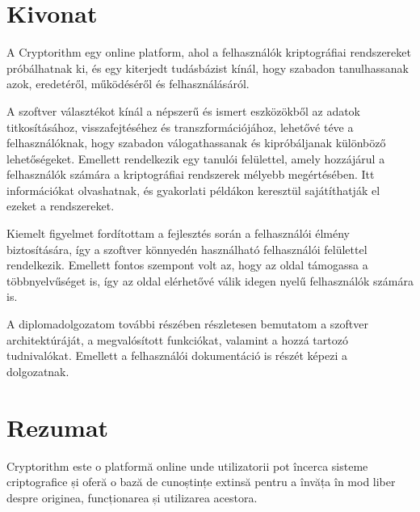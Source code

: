 
\hungarianParagraph


\chapter*{Kivonat}

A Cryptorithm egy online platform, ahol a felhasználók kriptográfiai rendszereket próbálhatnak ki, és egy kiterjedt tudásbázist kínál, hogy szabadon tanulhassanak azok, eredetéről, működéséről és felhasználásáról.

A szoftver választékot kínál a népszerű és ismert eszközökből az adatok titkosításához, visszafejtéséhez és transzformációjához, lehetővé téve a felhasználóknak, hogy szabadon válogathassanak és kipróbáljanak különböző lehetőségeket. Emellett rendelkezik egy tanulói felülettel, amely hozzájárul a felhasználók számára a kriptográfiai rendszerek mélyebb megértésében. Itt információkat olvashatnak, és gyakorlati példákon keresztül sajátíthatják el ezeket a rendszereket. 

Kiemelt figyelmet fordítottam a fejlesztés során a felhasználói élmény biztosítására, így a szoftver könnyedén használható felhasználói felülettel rendelkezik. Emellett fontos szempont volt az, hogy az oldal támogassa a többnyelvűséget is, így az oldal elérhetővé válik idegen nyelű felhasználók számára is.

A diplomadolgozatom további részében részletesen bemutatom a szoftver architektúráját, a megvalósított funkciókat, valamint a hozzá tartozó tudnivalókat. Emellett a felhasználói dokumentáció is részét képezi a dolgozatnak.


\vfill
{}

\chapter*{Rezumat}

Cryptorithm este o platformă online unde utilizatorii pot încerca sisteme criptografice și oferă o bază de cunoștințe extinsă pentru a învăța în mod liber despre originea, funcționarea și utilizarea acestora.

